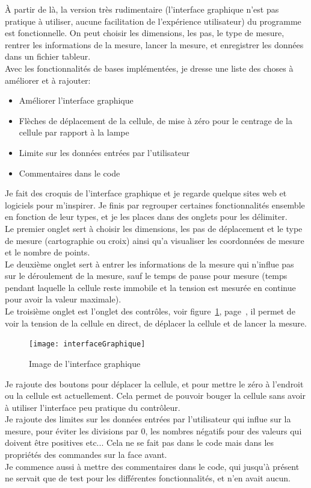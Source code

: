 \documentclass[12pt]{article}
\begin{document}
À partir de là, la version très rudimentaire (l'interface graphique n'est pas pratique à utiliser, aucune facilitation de l'expérience utilisateur) du programme est fonctionnelle.
On peut choisir les dimensions, les pas, le type de mesure, rentrer les informations de la mesure, lancer la mesure, et enregistrer les données dans un fichier tableur.\\
Avec les fonctionnalités de bases implémentées, je dresse une liste des choses à améliorer et à rajouter:
\begin{itemize}
	\item Améliorer l'interface graphique
	\item Flèches de déplacement de la cellule, de mise à zéro pour le centrage de la cellule par rapport à la lampe
	\item Limite sur les données entrées par l'utilisateur
	\item Commentaires dans le code
\end{itemize}
Je fait des croquis de l'interface graphique et je regarde quelque sites web et logiciels pour m'inspirer.
Je finis par regrouper certaines fonctionnalités ensemble en fonction de leur types, et je les places dans des onglets pour les délimiter.\\
Le premier onglet sert à choisir les dimensions, les pas de déplacement et le type de mesure (cartographie ou croix) ainsi qu'a visualiser les coordonnées de mesure et le nombre de points.\\
Le deuxième onglet sert à entrer les informations de la mesure qui n'influe pas sur le déroulement de la mesure, sauf le temps de pause pour mesure (temps pendant laquelle la cellule reste immobile et la tension est mesurée en continue pour avoir la valeur maximale).\\
Le troisième onglet est l'onglet des contrôles, voir figure~\ref{fig:interfaceGraphique}, page~\pageref{fig:interfaceGraphique}, il permet de voir la tension de la cellule en direct, de déplacer la cellule et de lancer la mesure.
\begin{figure}[h]
	\centering
	\texttt{[image: interfaceGraphique]}
	\caption{Image de l'interface graphique}
	\label{fig:interfaceGraphique}
\end{figure}
Je rajoute des boutons pour déplacer la cellule, et pour mettre le zéro à l'endroit ou la cellule est actuellement.
Cela permet de pouvoir bouger la cellule sans avoir à utiliser l'interface peu pratique du contrôleur.\\
Je rajoute des limites sur les données entrées par l'utilisateur qui influe sur la mesure, pour éviter les divisions par 0, les nombres négatifs pour des valeurs qui doivent être positives etc... Cela ne se fait pas dans le code mais dans les propriétés des commandes sur la face avant.\\
Je commence aussi à mettre des commentaires dans le code, qui jusqu'à présent ne servait que de test pour les différentes fonctionnalités, et n'en avait aucun.
\end{document}
